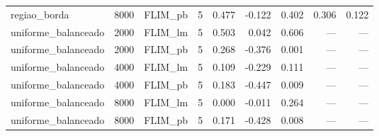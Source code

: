 \begin{tabular}{lllrrrrrr}
regiao\_borda & 8000 & FLIM\_pb & 5 & 0.477 & -0.122 & 0.402 & 0.306 & 0.122 \\
uniforme\_balanceado & 2000 & FLIM\_lm & 5 & 0.503 & 0.042 & 0.606 & --- & --- \\
uniforme\_balanceado & 2000 & FLIM\_pb & 5 & 0.268 & -0.376 & 0.001 & --- & --- \\
uniforme\_balanceado & 4000 & FLIM\_lm & 5 & 0.109 & -0.229 & 0.111 & --- & --- \\
uniforme\_balanceado & 4000 & FLIM\_pb & 5 & 0.183 & -0.447 & 0.009 & --- & --- \\
uniforme\_balanceado & 8000 & FLIM\_lm & 5 & 0.000 & -0.011 & 0.264 & --- & --- \\
uniforme\_balanceado & 8000 & FLIM\_pb & 5 & 0.171 & -0.428 & 0.008 & --- & --- \\
\hline
\end{tabular}
